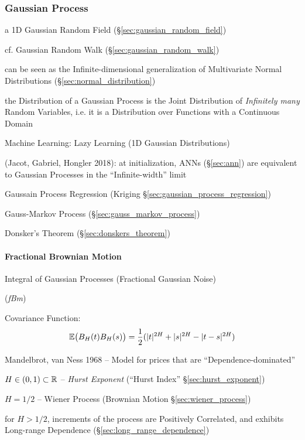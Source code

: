 \subsubsection{Gaussian Process}\label{sec:gaussian_process}

a 1D Gaussian Random Field (\S\ref{sec:gaussian_random_field})

cf. Gaussian Random Walk (\S\ref{sec:gaussian_random_walk})

can be seen as the Infinite-dimensional generalization of Multivariate Normal
Distributions (\S\ref{sec:normal_distribution})

the Distribution of a Gaussian Process is the Joint Distribution of
\emph{Infinitely many} Random Variables, i.e. it is a Distribution over
Functions with a Continuous Domain

Machine Learning: Lazy Learning (1D Gaussian Distributions)

(Jacot, Gabriel, Hongler 2018): at initialization, ANNs (\S\ref{sec:ann}) are
equivalent to Gaussian Processes in the ``Infinite-width'' limit

Gaussain Process Regression (Kriging \S\ref{sec:gaussian_process_regression})

\fist Gauss-Markov Process (\S\ref{sec:gauss_markov_process})

\fist Donsker's Theorem (\S\ref{sec:donskers_theorem})



\paragraph{Fractional Brownian Motion}\label{sec:fractional_brownian}\hfill

Integral of Gaussian Processes (Fractional Gaussian Noise)

(\emph{fBm})

Covariance Function:
\[
  \mathbb{E}\big(B_H(t) B_H(s)\big) =
    \frac{1}{2} (|t|^{2H} + |s|^{2H} - |t - s|^{2H})
\]

Mandelbrot, van Ness 1968 -- Model for prices that are ``Dependence-dominated''

$H \in (0,1) \subset \mathbb{R}$ -- \emph{Hurst Exponent} (``Hurst Index''
\S\ref{sec:hurst_exponent})

$H = 1/2$ -- Wiener Process (Brownian Motion \S\ref{sec:wiener_process})

for $H > 1/2$, increments of the process are Positively Correlated, and exhibits
Long-range Dependence (\S\ref{sec:long_range_dependence})

